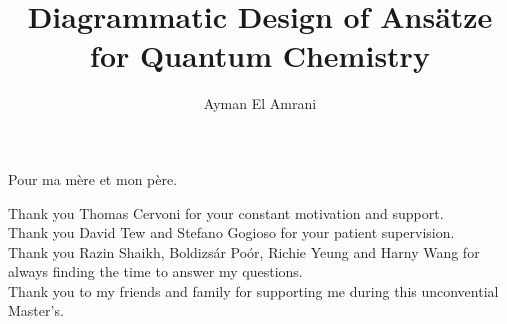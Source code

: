 \documentclass[a4paper,nobind]{ociamthesis}  %
\title{Diagrammatic Design of Ansätze for Quantum Chemistry}
\author{Ayman El Amrani}
\begin{document}
\setlength{\textbaselineskip}{22pt}  %
\setlength{\frontmatterbaselineskip}{17pt plus1pt minus1pt} %
\setlength{\baselineskip}{\textbaselineskip}


\setcounter{secnumdepth}{1}  %
\setcounter{tocdepth}{1}  %


\begin{romanpages}
\maketitle

\begin{dedication}
Pour ma mère et mon père. \\
\end{dedication}

\begin{acknowledgements}
Thank you Thomas Cervoni for your constant motivation and support. \\
Thank you David Tew and Stefano Gogioso for your patient supervision. \\
Thank you Razin Shaikh, Boldizsár Poór, Richie Yeung and Harny Wang for always finding the time to answer my questions. \\
Thank you to my friends and family for supporting me during this unconvential Master's.
\end{acknowledgements}

\begin{abstract}
	
\end{abstract}

\flushbottom  %

\tableofcontents

\end{romanpages}



% 
% 
% 
% 




\end{document}
